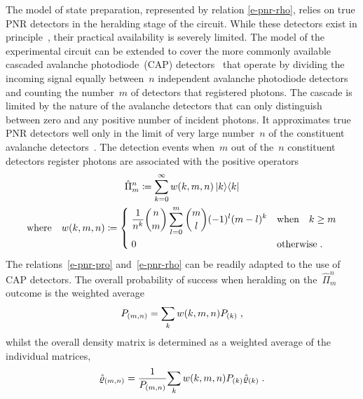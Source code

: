 \documentclass{article}
\begin{document}
The model of state preparation, represented by relation \eqref{e-pnr-rho}, relies on true PNR detectors in the heralding stage of the circuit. While these detectors exist in principle~\cite{hopker2019,endo2021,endo2024}, their practical availability is severely limited. The model of the experimental circuit can be extended to cover the more commonly available cascaded avalanche photodiode~(CAP) detectors~\cite{hlousek2019,grygar2022,hlousek2024,ercolano2024} that operate by dividing the incoming signal equally between~$n$ independent avalanche photodiode detectors and counting the number~$m$ of detectors that registered photons. The cascade is limited by the nature of the avalanche detectors that can only distinguish between zero and any positive number of incident photons. It approximates true PNR detectors well only in the limit of very large number~$n$ of the constituent avalanche detectors~\cite{provaznik2020}. The detection events when~$m$ out of the~$n$ constituent detectors register photons are associated with the positive operators~\cite{paul1996}
%
\begin{equation}\label{e-cap}
  \begin{gathered}
  \hat{\Pi}_{m}^{n} 
    \coloneqq \sum_{k = 0}^{\infty} w(k, m, n) \ketbra{k}{k} \\
  \text{where} \quad
  w(k, m, n) 
    \coloneqq 
    \begin{dcases}
      \; \frac{1}{n^{k}} \binom{n}{m} \sum_{l = 0}^{m} \binom{m}{l} (-1)^{l} (m - l)^{k} 
      & \text{when}\quad k \geq m \\
      \; 0 & \text{otherwise} \Qd
    \end{dcases}
  \end{gathered}
\end{equation} 
%
The relations~\eqref{e-pnr-pro} and~\eqref{e-pnr-rho} can be readily adapted to the use of CAP detectors. The overall probability of success when heralding on the~$\hat{\Pi}_{m}^{n}$ outcome is the weighted average
%
\begin{equation}\label{e-cap-pro}
  P_{(m, n)} = \sum_{k} w(k, m, n) P_{(k)} \;\text{,}
\end{equation}
%
whilst the overall density matrix is determined as a weighted average of the individual matrices,
\begin{equation}\label{e-cap-rho}
  \hat{\varrho}_{(m, n)} =
    \frac{1}{ P_{(m,n)} }
    { \sum_{k} w(k, m, n) P_{(k)} \hat{\varrho}_{(k)} }
  \;\text{.}
\end{equation}

%
%
\end{document}
